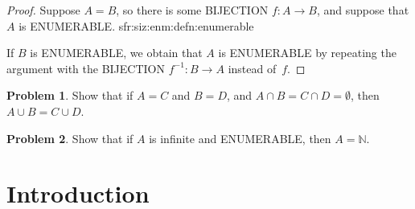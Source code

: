 \documentclass[10pt,a4paper]{article}
\newcommand*{\olup}[1]{\MakeUppercase{#1}}
\theoremstyle{plain}
\theoremstyle{definition}
\newtheorem{prob}{Problem}[section]
\theoremstyle{remark}
\newcommand*{\olfileid}[3]{}
\newcommand*{\olsection}[1]{\section*{#1}}
\providecommand{\Nat}{\ensuremath{\mathbb{N}}}
\providecommand{\PosInt}{\mathbb{Z}^{+}}
\providecommand{\comp}{\circ}
\providecommand{\oliflabeldef}[3]{#1}
\providecommand{\cardeq}[2]{#1 = #2}
\begin{document}
\begin{proof}
Suppose $\cardeq{A}{B}$, so there is some \olup{bijection} $f \colon A
\to B$, and suppose that $A$ is \olup{enumerable}.
\oliflabeldef{sfr:siz:enm:defn:enumerable}{
  Then either $A = \emptyset$ or there is \olup{surjective} function
  $g\colon \PosInt \to A$. If $A = \emptyset$, then $B = \emptyset$
  also (otherwise there would be \olup{element}~$y \in B$ but no $x \in
  A$ with $g(x) = y$). If, on the other hand, $g\colon \PosInt \to A$
  is \olup{surjective}, then $\comp{g}{f} \colon \PosInt \to B$ is
  \olup{surjective}. To see this, let $y \in B$. Since $f$ is
  \olup{surjective}, there is an $x \in A$ such that $f(x) = y$. Since
  $g$ is \olup{surjective}, there is an $n \in \PosInt$ such that $g(n) =
  x$. Hence,
\[
(\comp{g}{f})(n) = f(g(n)) = f(x) = y
\]
and thus $\comp{g}{f}$ is \olup{surjective}. We have that $\comp{g}{f}$
is an enumeration of~$B$, and so $B$~is \olup{enumerable}.}
{
  Then either $A  = \emptyset$ or there is \olup{bijection}~$g$ whose
  range is $A$ and whose domain is either $\Nat$ or an initial
  sequence of natural numbers. If $A = \emptyset$, then $B =
  \emptyset$ also (otherwise there would be some~$y \in B$ with no $x
  \in A$ such that $g(x) = y$). So suppose we have our
  \olup{bijection}~$g$. Then $\comp{g}{f}$ is \olup{bijection} with
  range~$B$ and domain the same as that of~$g$ (i.e., either $\Nat$ or
  an initial segment of it), so that $B$ is \olup{enumerable}.}

If $B$ is \olup{enumerable}, we obtain that $A$ is \olup{enumerable} by
repeating the argument with the \olup{bijection} $f^{-1}\colon B \to A$
instead of~$f$. 
\end{proof}

\begin{prob}
Show that if $\cardeq{A}{C}$ and $\cardeq{B}{D}$, and $A \cap B =
C \cap D = \emptyset$, then $\cardeq{A \cup B}{C \cup D}$.
\end{prob}

\begin{prob}
Show that if $A$ is infinite and \olup{enumerable}, then
$\cardeq{A}{\Nat}$.
\end{prob}





\olfileid{sfr}{siz}{int}

\olsection{Introduction}
\end{document}
